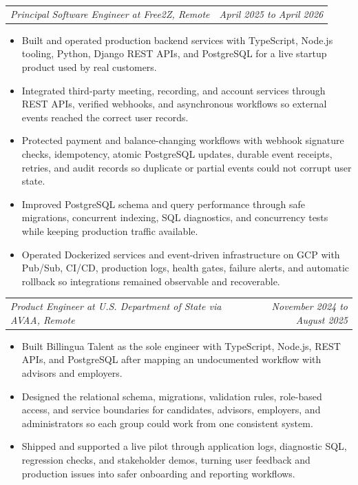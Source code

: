 \documentclass[10pt,letterpaper]{article}
\makeatletter
\newcommand{\bodyfont}{\fontsize{10.5}{15.75}\selectfont}
\newcommand{\roleline}[2]{%
  \begin{tabularx}{\textwidth}{@{}Xr@{}}
    \bodyfont\textit{#1} & \bodyfont\textit{#2}
  \end{tabularx}
  \nopagebreak[4]
  \vspace{1pt}
}
\makeatother
\begin{document}
\vspace{3pt}
\roleline{Principal Software Engineer at Free2Z, Remote}{April 2025 to April 2026}
\begin{itemize}
  \item Built and operated production backend services with TypeScript, Node.js tooling, Python, Django REST APIs, and PostgreSQL for a live startup product used by real customers.
  \item Integrated third-party meeting, recording, and account services through REST APIs, verified webhooks, and asynchronous workflows so external events reached the correct user records.
  \item Protected payment and balance-changing workflows with webhook signature checks, idempotency, atomic PostgreSQL updates, durable event receipts, retries, and audit records so duplicate or partial events could not corrupt user state.
  \item Improved PostgreSQL schema and query performance through safe migrations, concurrent indexing, SQL diagnostics, and concurrency tests while keeping production traffic available.
  \item Operated Dockerized services and event-driven infrastructure on GCP with Pub/Sub, CI/CD, production logs, health gates, failure alerts, and automatic rollback so integrations remained observable and recoverable.
\end{itemize}

\vspace{3pt}
\roleline{Product Engineer at U.S. Department of State via AVAA, Remote}{November 2024 to August 2025}
\begin{itemize}
  \item Built Billingua Talent as the sole engineer with TypeScript, Node.js, REST APIs, and PostgreSQL after mapping an undocumented workflow with advisors and employers.
  \item Designed the relational schema, migrations, validation rules, role-based access, and service boundaries for candidates, advisors, employers, and administrators so each group could work from one consistent system.
  \item Shipped and supported a live pilot through application logs, diagnostic SQL, regression checks, and stakeholder demos, turning user feedback and production issues into safer onboarding and reporting workflows.
\end{itemize}
\end{document}
